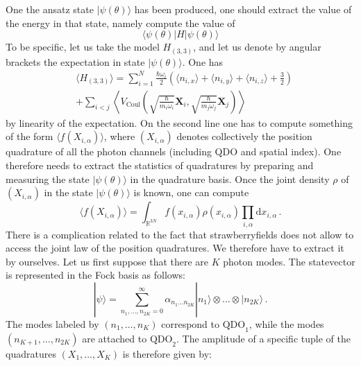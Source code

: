\documentclass[reprint, amsmath, amssymb, aps]{revtex4-2}
\begin{document}
    One the ansatz state $|\psi(\theta)\rangle$ has been produced, one should extract the value of the energy in that state, namely compute the value of
    \begin{equation}
        \langle\psi(\theta)|H|\psi(\theta)\rangle
    \end{equation}
    To be specific, let us take the model $H_{(3,3)}$, and let us denote by angular brackets the expectation in state $|\psi(\theta)\rangle$. One has
    \begin{equation}
    \label{eq:loss}
    \begin{split}
        &\langle H_{(3,3)}\rangle = \sum_{i=1}^N\frac{\hbar\omega_i}{2}\left(\langle n_{i,x}\rangle+\langle n_{i,y}\rangle+\langle n_{i,z}\rangle+\frac{3}{2}\right)\\
        &+ \sum_{i<j}\left\langle V_\text{Coul}\left(\sqrt{\frac{\hbar}{m_i\omega_i}}\bm X_i, \sqrt{\frac{\hbar}{m_j\omega_j}}\bm X_j\right)\right\rangle
    \end{split}
    \end{equation}
    by linearity of the expectation. On the second line one has to compute something of the form $\langle f(X_{i,\alpha})\rangle$, where $(X_{i,\alpha})$ denotes collectively the position quadrature of all the photon channels (including QDO and spatial index). One therefore needs to extract the statistics of quadratures by preparing and measuring the state $|\psi(\theta)\rangle$ in the quadrature basis. Once the joint density $\rho$ of $(X_{i,\alpha})$ in the state $|\psi(\theta)\rangle$ is known, one can compute
    \begin{equation}
        \langle f(X_{i,\alpha})\rangle = \int_{\mathbb R^{3N}}f(x_{i,\alpha})\rho(x_{i,\alpha})\prod_{i,\alpha}\text{d}x_{i,\alpha}\,.
    \end{equation}
    There is a complication related to the fact that strawberryfields does not allow to access the joint law of the position quadratures. We therefore have to extract it by ourselves. Let us first suppose that there are $K$ photon modes. The statevector is represented in the Fock basis as follows:
    \begin{equation}
        |\psi\rangle = \sum_{n_1,\dots,n_{2K}=0}^\infty \alpha_{n_1\dots n_{2K}}|n_1\rangle\otimes\dots\otimes|n_{2K}\rangle\,.
    \end{equation}
    The modes labeled by $(n_1,\dots,n_K)$ correspond to $\text{QDO}_1$, while the modes $(n_{K+1},\dots,n_{2K})$ are attached to $\text{QDO}_2$.
    The amplitude of a specific tuple of the quadratures $(X_1,\dots, X_{K})$ is therefore given by:
\end{document}
